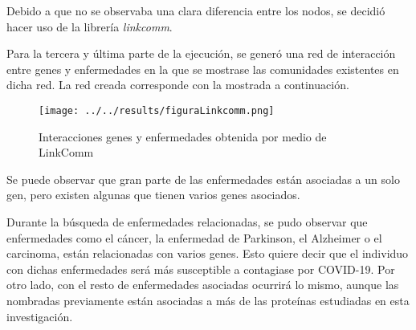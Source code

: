 \newline

Debido a que no se observaba una clara diferencia entre los nodos, se decidió hacer uso de la librería \textit{linkcomm}.

\newline

Para la tercera y última parte de la ejecución, se generó una red de interacción entre genes y enfermedades en la que se mostrase las comunidades existentes en dicha red. La red creada corresponde con la mostrada a continuación.

\newline

\begin{figure}[h!]
	\texttt{[image: ../../results/figuraLinkcomm.png]}
	\caption{Interacciones genes y enfermedades obtenida por medio de LinkComm}
	\label{fig:red_linkcomm}
\end{figure}

\newline

Se puede observar que gran parte de las enfermedades están asociadas a un solo gen, pero existen algunas que tienen varios genes asociados. 

\newline

Durante la búsqueda de enfermedades relacionadas, se pudo observar que enfermedades como el cáncer, la enfermedad de Parkinson, el Alzheimer o el carcinoma, están relacionadas con varios genes. Esto quiere decir que el individuo con dichas enfermedades será más susceptible a contagiase por COVID-19. Por otro lado, con el resto de enfermedades asociadas ocurrirá lo mismo, aunque las nombradas previamente están asociadas a más de las proteínas estudiadas en esta investigación.

\newline

